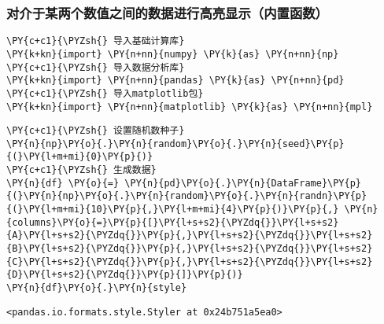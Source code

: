     \hypertarget{ux5bf9ux4ecbux4e8eux67d0ux4e24ux4e2aux6570ux503cux4e4bux95f4ux7684ux6570ux636eux8fdbux884cux9ad8ux4eaeux663eux793aux5185ux7f6eux51fdux6570}{%
\subsubsection{对介于某两个数值之间的数据进行高亮显示（内置函数）}\label{ux5bf9ux4ecbux4e8eux67d0ux4e24ux4e2aux6570ux503cux4e4bux95f4ux7684ux6570ux636eux8fdbux884cux9ad8ux4eaeux663eux793aux5185ux7f6eux51fdux6570}}

    \begin{tcolorbox}[breakable, size=fbox, boxrule=1pt, pad at break*=1mm,colback=cellbackground, colframe=cellborder]
\begin{Verbatim}[commandchars=\\\{\}]
\PY{c+c1}{\PYZsh{} 导入基础计算库}
\PY{k+kn}{import} \PY{n+nn}{numpy} \PY{k}{as} \PY{n+nn}{np}
\PY{c+c1}{\PYZsh{} 导入数据分析库}
\PY{k+kn}{import} \PY{n+nn}{pandas} \PY{k}{as} \PY{n+nn}{pd}
\PY{c+c1}{\PYZsh{} 导入matplotlib包}
\PY{k+kn}{import} \PY{n+nn}{matplotlib} \PY{k}{as} \PY{n+nn}{mpl}
\end{Verbatim}
\end{tcolorbox}

    \begin{tcolorbox}[breakable, size=fbox, boxrule=1pt, pad at break*=1mm,colback=cellbackground, colframe=cellborder]
\begin{Verbatim}[commandchars=\\\{\}]
\PY{c+c1}{\PYZsh{} 设置随机数种子}
\PY{n}{np}\PY{o}{.}\PY{n}{random}\PY{o}{.}\PY{n}{seed}\PY{p}{(}\PY{l+m+mi}{0}\PY{p}{)}
\PY{c+c1}{\PYZsh{} 生成数据}
\PY{n}{df} \PY{o}{=} \PY{n}{pd}\PY{o}{.}\PY{n}{DataFrame}\PY{p}{(}\PY{n}{np}\PY{o}{.}\PY{n}{random}\PY{o}{.}\PY{n}{randn}\PY{p}{(}\PY{l+m+mi}{10}\PY{p}{,}\PY{l+m+mi}{4}\PY{p}{)}\PY{p}{,} \PY{n}{columns}\PY{o}{=}\PY{p}{[}\PY{l+s+s2}{\PYZdq{}}\PY{l+s+s2}{A}\PY{l+s+s2}{\PYZdq{}}\PY{p}{,}\PY{l+s+s2}{\PYZdq{}}\PY{l+s+s2}{B}\PY{l+s+s2}{\PYZdq{}}\PY{p}{,}\PY{l+s+s2}{\PYZdq{}}\PY{l+s+s2}{C}\PY{l+s+s2}{\PYZdq{}}\PY{p}{,}\PY{l+s+s2}{\PYZdq{}}\PY{l+s+s2}{D}\PY{l+s+s2}{\PYZdq{}}\PY{p}{]}\PY{p}{)}
\PY{n}{df}\PY{o}{.}\PY{n}{style}
\end{Verbatim}
\end{tcolorbox}

            \begin{tcolorbox}[breakable, size=fbox, boxrule=.5pt, pad at break*=1mm, opacityfill=0]
\begin{Verbatim}[commandchars=\\\{\}]
<pandas.io.formats.style.Styler at 0x24b751a5ea0>
\end{Verbatim}
\end{tcolorbox}
        

